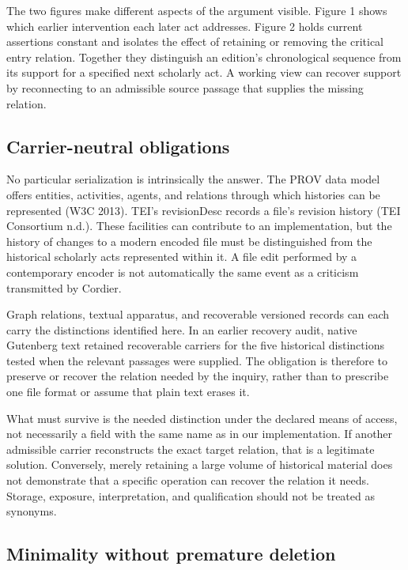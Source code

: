 \documentclass[11pt,a4paper]{article}
\begin{document}
The two figures make different aspects of the argument visible. Figure 1 shows which earlier intervention each later act addresses. Figure 2 holds current assertions constant and isolates the effect of retaining or removing the critical entry relation. Together they distinguish an edition's chronological sequence from its support for a specified next scholarly act. A working view can recover support by reconnecting to an admissible source passage that supplies the missing relation.


\subsection{Carrier-neutral obligations}

No particular serialization is intrinsically the answer. The PROV data model offers entities, activities, agents, and relations through which histories can be represented (W3C 2013). TEI's revisionDesc records a file's revision history (TEI Consortium n.d.). These facilities can contribute to an implementation, but the history of changes to a modern encoded file must be distinguished from the historical scholarly acts represented within it. A file edit performed by a contemporary encoder is not automatically the same event as a criticism transmitted by Cordier.


Graph relations, textual apparatus, and recoverable versioned records can each carry the distinctions identified here. In an earlier recovery audit, native Gutenberg text retained recoverable carriers for the five historical distinctions tested when the relevant passages were supplied. The obligation is therefore to preserve or recover the relation needed by the inquiry, rather than to prescribe one file format or assume that plain text erases it.


What must survive is the needed distinction under the declared means of access, not necessarily a field with the same name as in our implementation. If another admissible carrier reconstructs the exact target relation, that is a legitimate solution. Conversely, merely retaining a large volume of historical material does not demonstrate that a specific operation can recover the relation it needs. Storage, exposure, interpretation, and qualification should not be treated as synonyms.


\subsection{Minimality without premature deletion}
\end{document}
